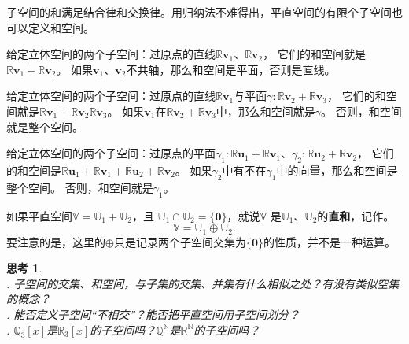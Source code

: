 \documentclass[12pt,UTF8]{ctexbook}
\newtheorem{sk}{思考}[section]
\begin{document}
子空间的和满足结合律和交换律。用归纳法不难得出，平直空间的有限个子空间也可以定义和空间。

给定立体空间的两个子空间：过原点的直线$\mathbb{R}\mathbf{v}_1$、$\mathbb{R}\mathbf{v}_2$，
它们的和空间就是$\mathbb{R}\mathbf{v}_1 + \mathbb{R}\mathbf{v}_2$。
如果$\mathbf{v}_1$、$\mathbf{v}_2$不共轴，那么和空间是平面，否则是直线。

给定立体空间的两个子空间：过原点的直线$\mathbb{R}\mathbf{v}_1$与平面$\gamma: \mathbb{R}\mathbf{v}_2 + \mathbb{R}\mathbf{v}_3$，
它们的和空间就是$\mathbb{R}\mathbf{v}_1 + \mathbb{R}\mathbf{v}_2 \mathbb{R}\mathbf{v}_3$。
如果$\mathbf{v}_1$在$\mathbb{R}\mathbf{v}_2 + \mathbb{R}\mathbf{v}_3$中，那么和空间就是$\gamma$。
否则，和空间就是整个空间。

给定立体空间的两个子空间：过原点的平面$\gamma_1: \mathbb{R}\mathbf{u}_1 + \mathbb{R}\mathbf{v}_1$、$\gamma_2: \mathbb{R}\mathbf{u}_2 + \mathbb{R}\mathbf{v}_2$，
它们的和空间是$\mathbb{R}\mathbf{u}_1 + \mathbb{R}\mathbf{v}_1 + \mathbb{R}\mathbf{u}_2 + \mathbb{R}\mathbf{v}_2$。
如果$\gamma_2$中有不在$\gamma_1$中的向量，那么和空间是整个空间。
否则，和空间就是$\gamma_1$。

如果平直空间$\mathbb{V} = \mathbb{U}_1 + \mathbb{U}_2$，且
$\mathbb{U}_1 \cap \mathbb{U}_2 = \{\mathbf{0}\}$，就说$\mathbb{V}$
是$\mathbb{U}_1$、$\mathbb{U}_2$的\textbf{直和}，记作。
$$\mathbb{V} = \mathbb{U}_1 \oplus \mathbb{U}_2.$$
要注意的是，这里的$\oplus$只是记录两个子空间交集为$\{\mathbf{0}\}$的性质，并不是一种运算。

\begin{sk}
    \mbox{} \\
    . 子空间的交集、和空间，与子集的交集、并集有什么相似之处？有没有类似空集的概念？\\
    . 能否定义子空间“不相交”？能否把平直空间用子空间划分？\\
    . $\mathbb{Q}_3[x]$是$\mathbb{R}_3[x]$的子空间吗？$\mathbb{Q}^\mathbb{N}$是$\mathbb{R}^\mathbb{N}$的子空间吗？
\end{sk}
\end{document}
